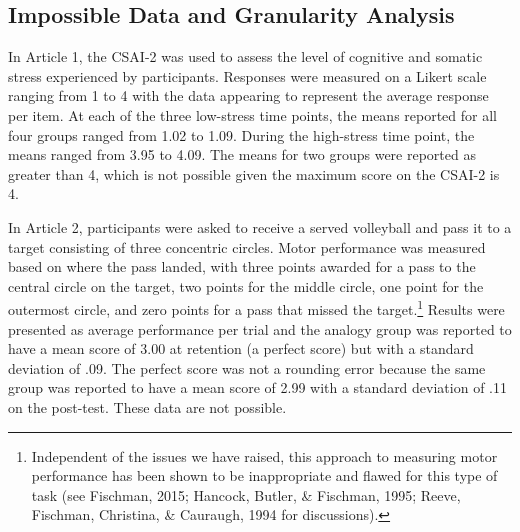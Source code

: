 \documentclass[
  english,
  man,floatsintext]{apa7}
\begin{document}
\hypertarget{impossible-data-and-granularity-analysis}{%
\subsection{Impossible Data and Granularity Analysis}\label{impossible-data-and-granularity-analysis}}

In Article 1, the CSAI-2 was used to assess the level of cognitive and somatic stress experienced by participants. Responses were measured on a Likert scale ranging from 1 to 4 with the data appearing to represent the average response per item. At each of the three low-stress time points, the means reported for all four groups ranged from 1.02 to 1.09. During the high-stress time point, the means ranged from 3.95 to 4.09. The means for two groups were reported as greater than 4, which is not possible given the maximum score on the CSAI-2 is 4.

In Article 2, participants were asked to receive a served volleyball and pass it to a target consisting of three concentric circles. Motor performance was measured based on where the pass landed, with three points awarded for a pass to the central circle on the target, two points for the middle circle, one point for the outermost circle, and zero points for a pass that missed the target.\footnote{Independent of the issues we have raised, this approach to measuring motor performance has been shown to be inappropriate and flawed for this type of task (see Fischman, 2015; Hancock, Butler, \& Fischman, 1995; Reeve, Fischman, Christina, \& Cauraugh, 1994 for discussions).} Results were presented as average performance per trial and the analogy group was reported to have a mean score of 3.00 at retention (a perfect score) but with a standard deviation of .09. The perfect score was not a rounding error because the same group was reported to have a mean score of 2.99 with a standard deviation of .11 on the post-test. These data are not possible.
\end{document}
